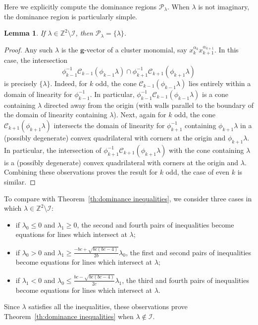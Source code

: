 \documentclass{amsart}
\newtheorem{lemma}[theorem]{Lemma}
\numberwithin{theorem}{section}
\newcommand{\bfg}{\boldsymbol{g}}
\newcommand{\cC}{\mathcal{C}}
\newcommand{\cI}{\mathcal{I}}
\newcommand{\cP}{\mathcal{P}}
\newcommand{\ZZ}{\mathbb{Z}}
\begin{document}
  Here we explicitly compute the dominance regions $\cP_\lambda$.
  When $\lambda$ is not imaginary, the dominance region is particularly simple.
  \begin{lemma}
    \label{le:cluster monomials}
    If $\lambda\in\ZZ^2\setminus\cI$, then $\cP_\lambda=\{\lambda\}$.
  \end{lemma}
  \begin{proof}
    Any such $\lambda$ is the $\bfg$-vector of a cluster monomial, say $x_k^{\alpha_k}x_{k+1}^{\alpha_{k+1}}$.
    In this case, the intersection
    \[\phi_{k-1}^{-1}\cC_{k-1}(\phi_{k-1}\lambda) \cap \phi_{k+1}^{-1}\cC_{k+1}(\phi_{k+1}\lambda)\]
    is precisely $\{\lambda\}$. 
    Indeed, for $k$ odd, the cone $\cC_{k-1}(\phi_{k-1}\lambda)$ lies entirely within a domain of linearity for $\phi_{k-1}^{-1}$.
    In particular, $\phi_{k-1}^{-1}\cC_{k-1}(\phi_{k-1}\lambda)$ is a cone containing $\lambda$ directed away from the origin (with walls parallel to the boundary of the domain of linearity containing $\lambda$).
    Next, again for $k$ odd, the cone $\cC_{k+1}(\phi_{k+1}\lambda)$ intersects the domain of linearity for $\phi_{k+1}^{-1}$ containing $\phi_{k+1}\lambda$ in a (possibly degenerate) convex quadrilateral with corners at the origin and $\phi_{k+1}\lambda$.
    In particular, the intersection of $\phi_{k+1}^{-1}\cC_{k+1}(\phi_{k+1}\lambda)$ with the cone containing $\lambda$ is a (possibly degenerate) convex quadrilateral with corners at the origin and $\lambda$.
    Combining these observations proves the result for $k$ odd, the case of even $k$ is similar.
  \end{proof}
  To compare with Theorem~\ref{th:dominance inequalities}, we consider three cases in which $\lambda\in\ZZ^2\setminus\cI$:
  \begin{itemize}
    \item if $\lambda_0 \le 0$ and $\lambda_1 \ge 0$, the second and fourth pairs of inequalities become equations for lines which intersect at $\lambda$;
    \item if $\lambda_0 > 0$ and $\lambda_1 \ge \frac{-bc+\sqrt{bc(bc-4)}}{2b}\lambda_0$, the first and second pairs of inequalities become equations for lines which intersect at $\lambda$;
    \item if $\lambda_1 < 0$ and $\lambda_0 \le \frac{bc-\sqrt{bc(bc-4)}}{2c}\lambda_1$, the third and fourth pairs of inequalities become equations for lines which intersect at $\lambda$.
  \end{itemize}
  Since $\lambda$ satisfies all the inequalities, these observations prove Theorem~\ref{th:dominance inequalities} when $\lambda\notin\cI$.
\end{document}
